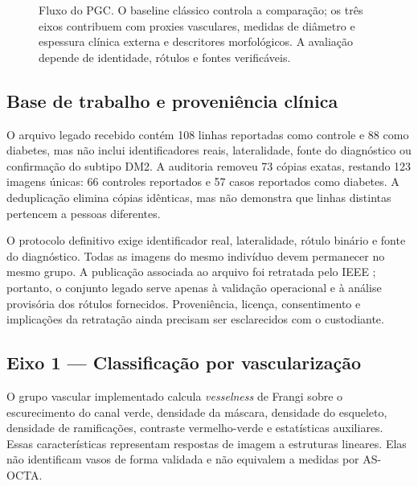 \documentclass[12pt,a4paper]{article}
\begin{document}
\begin{figure}[H]
{
}%
\caption{Fluxo do PGC. O baseline clássico controla a comparação; os três eixos contribuem com
proxies vasculares, medidas de diâmetro e espessura clínica externa e descritores morfológicos. A
avaliação depende de identidade, rótulos e fontes verificáveis.}
\label{fig:pipeline}
\end{figure}

\subsection{Base de trabalho e proveniência clínica}
O arquivo legado recebido contém 108 linhas reportadas como controle e 88 como diabetes, mas não
inclui identificadores reais, lateralidade, fonte do diagnóstico ou confirmação do subtipo DM2. A
auditoria removeu 73 cópias exatas, restando 123 imagens únicas: 66 controles reportados e 57 casos
reportados como diabetes. A deduplicação elimina cópias idênticas, mas não demonstra que linhas
distintas pertencem a pessoas diferentes.

O protocolo definitivo exige identificador real, lateralidade, rótulo binário e fonte do diagnóstico.
Todas as imagens do mesmo indivíduo devem permanecer no mesmo grupo. A publicação associada ao
arquivo foi retratada pelo IEEE \citep{RetractionNotice2023}; portanto, o conjunto legado serve apenas
à validação operacional e à análise provisória dos rótulos fornecidos. Proveniência, licença,
consentimento e implicações da retratação ainda precisam ser esclarecidos com o custodiante.

\subsection{Eixo 1 --- Classificação por vascularização}
O grupo vascular implementado calcula \emph{vesselness} de Frangi sobre o escurecimento do canal
verde, densidade da máscara, densidade do esqueleto, densidade de ramificações, contraste
vermelho-verde e estatísticas auxiliares. Essas características representam respostas de imagem a
estruturas lineares. Elas não identificam vasos de forma validada e não equivalem a medidas por
AS-OCTA.
\end{document}

